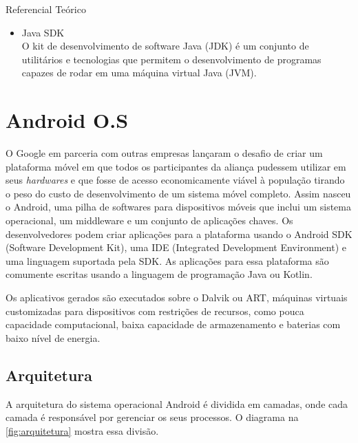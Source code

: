 \documentclass[
	12pt,				%
	openany,			%
	twoside,			%
	a4paper,			%
	english,			%
	french,				%
	spanish,			%
	brazil				%
	]{abntex2}
\begin{document}
\begin{chapter}{Referencial Teórico}
\begin{itemize}
     \item{Java SDK} \\
O kit de desenvolvimento de software Java (JDK) é um conjunto de utilitários e tecnologias que permitem o desenvolvimento de programas capazes de rodar em uma máquina virtual Java (JVM).
\end{itemize}


\section{Android O.S}
O Google em parceria com outras empresas lançaram o desafio de criar um plataforma móvel em que todos os participantes da aliança pudessem utilizar em seus \textit{hardwares} e que fosse de acesso economicamente viável à população tirando o peso do custo de desenvolvimento de um sistema móvel completo. Assim nasceu o Android, uma pilha de softwares para dispositivos móveis que inclui um sistema operacional, um middleware e um conjunto de aplicações chaves. Os desenvolvedores podem criar aplicações para a plataforma usando o Android SDK (Software Development Kit), uma IDE (Integrated Development Environment) e uma linguagem suportada pela SDK. As aplicações para essa plataforma são comumente escritas usando a linguagem de programação Java ou Kotlin. \cite{rbhag}

Os aplicativos gerados são executados sobre o Dalvik ou ART,  máquinas virtuais customizadas para dispositivos com restrições de recursos, como pouca capacidade computacional, baixa capacidade de armazenamento e baterias com baixo nível de energia.

\newpage
\subsection{Arquitetura}
A arquitetura do sistema operacional Android é dividida em camadas, onde cada camada é responsável por gerenciar os seus processos. O diagrama na \autoref{fig:arquitetura} mostra essa divisão.


\end{chapter}
\end{document}
